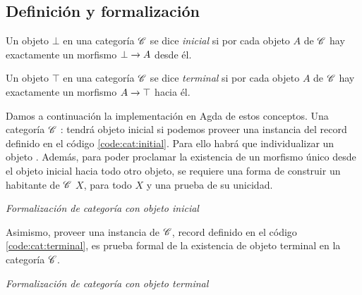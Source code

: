 \subsection{Definición y formalización}
\begin{definition}\label{cat:initial}

 Un objeto $\bot$ en una categoría $\mathscr{C}$ se dice {\it inicial} si por cada objeto $A$ de $\mathscr{C}$ hay exactamente un morfismo $ \bot\xrightarrow{}A$ desde él.
\begin{center}
  \xymatrixcolsep{3pc}
  \centerline{}
\end{center}

\end{definition}

\begin{definition}\label{cat:term}

 Un objeto $\top$ en una categoría $\mathscr{C}$ se dice {\it terminal} si por cada objeto $A$ de $\mathscr{C}$ hay exactamente un morfismo $ A\xrightarrow{}\top$ hacia él.
\begin{center}
  \xymatrixcolsep{3pc}
  \centerline{}
\end{center}

\end{definition}


Damos a continuación la implementación en Agda de estos conceptos. Una categoría $\mathscr{C}$ :  tendrá objeto inicial si podemos proveer una instancia del record definido en el código \ref{code:cat:initial}.  Para ello habrá que individualizar un objeto . Además, para poder proclamar la existencia de un morfismo único desde el objeto inicial hacia todo otro objeto, se requiere una forma de construir un habitante de  $\mathscr{C}$  $X$, para todo $X$ y una prueba de su unicidad.

\begin{agdacode}{\it Formalización de categoría con objeto inicial}\hspace{3ex}\label{code:cat:initial}
  
\end{agdacode}

Asimismo, proveer una instancia de  $\mathscr{C}$, record definido en el código \ref{code:cat:terminal}, es prueba formal de la existencia de objeto terminal en la categoría $\mathscr{C}$.

\begin{agdacode}{\it Formalización de categoría con objeto terminal}\hspace{3ex}\label{code:cat:terminal}
  
\end{agdacode}

